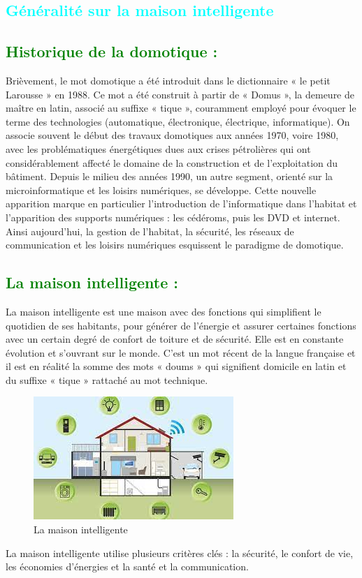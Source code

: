 \begin{flushleft}
	\section{\textcolor{cyan}{Généralité sur la maison intelligente}}
	\subsection{\textcolor{green}{Historique de la domotique :}}
	Brièvement, le mot domotique a été introduit dans le dictionnaire « le
	petit Larousse » en 1988. Ce mot a été construit à partir de « Domus »,
	la demeure de maître en latin, associé au suffixe « tique », couramment
	employé pour évoquer le terme des technologies (automatique,
	électronique, électrique, informatique). On associe souvent le début des
	travaux domotiques aux années 1970, voire 1980, avec les
	problématiques énergétiques dues aux crises pétrolières qui ont
	considérablement affecté le domaine de la construction et de
	l’exploitation du bâtiment. Depuis le milieu des années 1990, un autre
	segment, orienté sur la microinformatique et les loisirs numériques, se
	développe. Cette nouvelle apparition marque en particulier
	l’introduction de l’informatique dans l’habitat et l’apparition des
	supports numériques : les cédéroms, puis les DVD et internet. Ainsi
	aujourd’hui, la gestion de l’habitat, la sécurité, les réseaux de
	communication et les loisirs numériques esquissent le paradigme de
	domotique.
	\subsection{\textcolor{green}{La maison intelligente :}}
	 La maison intelligente est une maison avec des fonctions qui
	 simplifient le quotidien de ses habitants, pour générer de l'énergie et
	 assurer certaines fonctions avec un certain degré de confort de toiture et de sécurité. Elle est en constante évolution et s'ouvrant sur le monde.
	 C’est un mot récent de la langue française et il est en réalité la somme
	 des mots « doums » qui signifient domicile en latin et du suffixe « tique » rattaché au mot technique.
	 \begin{figure}[h]
	 	\centering
	 	\includegraphics{chapitres/images/SmartHome.jpg}
	 	\caption{La maison intelligente}
	 	\label{fig:labelname}
	 \end{figure}
  La maison intelligente utilise plusieurs critères clés : la sécurité, le confort de vie, les économies d’énergies et la santé et la communication.

\end{flushleft}

